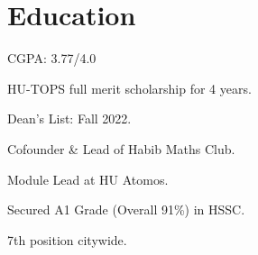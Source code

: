 \documentclass[]{resume}
\begin{document}
\begin{minipage}[t]{0.5\textwidth}

    \section{Education}
     
    \begin{tightemize}
        \sectionsep
        \item CGPA: 3.77/4.0
        \item HU-TOPS full merit scholarship for 4 years.
        \item Dean's List: Fall 2022.
        \item Cofounder \& Lead of Habib Maths Club.
        \item Module Lead at HU Atomos.
    \end{tightemize}

    \sectionsep

     
    \begin{tightemize}
        \item Secured A1 Grade (Overall 91\%) in HSSC.
        \item 7th position citywide.
    \end{tightemize}


\end{minipage}
\end{document}
